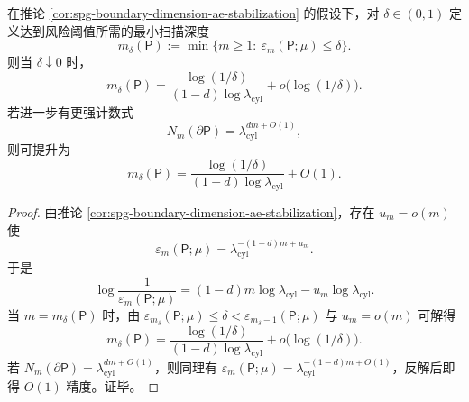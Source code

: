 \begin{theorem}[风险阈值的扫描深度渐近律]\label{thm:spg-clarity-risk-threshold-depth-law}
在推论 \ref{cor:spg-boundary-dimension-ae-stabilization} 的假设下，对 \(\delta\in(0,1)\) 定义达到风险阈值所需的最小扫描深度
\[
m_\delta(\mathsf P):=\min\{m\ge 1:\ \varepsilon_m(\mathsf P;\mu)\le \delta\}.
\]
则当 \(\delta\downarrow 0\) 时，
\[
m_\delta(\mathsf P)
=
\frac{\log(1/\delta)}{(1-d)\log\lambda_{\mathrm{cyl}}}
+o\!\bigl(\log(1/\delta)\bigr).
\]
若进一步有更强计数式
\[
N_m(\partial\mathsf P)=\lambda_{\mathrm{cyl}}^{dm+O(1)},
\]
则可提升为
\[
m_\delta(\mathsf P)
=
\frac{\log(1/\delta)}{(1-d)\log\lambda_{\mathrm{cyl}}}
+O(1).
\]
\end{theorem}
\begin{proof}
由推论 \ref{cor:spg-boundary-dimension-ae-stabilization}，存在 \(u_m=o(m)\) 使
\[
\varepsilon_m(\mathsf P;\mu)
=
\lambda_{\mathrm{cyl}}^{-(1-d)m+u_m}.
\]
于是
\[
\log\frac{1}{\varepsilon_m(\mathsf P;\mu)}
=
(1-d)m\log\lambda_{\mathrm{cyl}}-u_m\log\lambda_{\mathrm{cyl}}.
\]
当 \(m=m_\delta(\mathsf P)\) 时，由 \(\varepsilon_{m_\delta}(\mathsf P;\mu)\le \delta<\varepsilon_{m_\delta-1}(\mathsf P;\mu)\) 与 \(u_m=o(m)\) 可解得
\[
m_\delta(\mathsf P)
=
\frac{\log(1/\delta)}{(1-d)\log\lambda_{\mathrm{cyl}}}
+o\!\bigl(\log(1/\delta)\bigr).
\]
若 \(N_m(\partial\mathsf P)=\lambda_{\mathrm{cyl}}^{dm+O(1)}\)，则同理有 \(\varepsilon_m(\mathsf P;\mu)=\lambda_{\mathrm{cyl}}^{-(1-d)m+O(1)}\)，反解后即得 \(O(1)\) 精度。证毕。
\end{proof}

